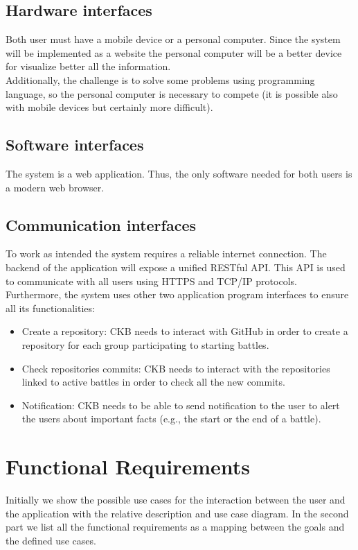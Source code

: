 \documentclass[12pt, a4paper]{report}
\newcounter{Requirements}
\newcounter{goals}
\begin{document}
    \subsection{Hardware interfaces}
    Both user must have a mobile device or a personal computer. 
    Since the system will be implemented as a website the personal computer will be a better device for visualize better all the information. \\
    Additionally, the challenge is to solve some problems using programming language, so the personal computer is necessary to compete (it is possible also with mobile devices but certainly more difficult). 

    \subsection{Software interfaces}
    The system is a web application. 
    Thus, the only software needed for both users is a modern web browser. 

    \subsection{Communication interfaces}
    To work as intended the system requires a reliable internet connection. 
    The backend of the application will expose a unified RESTful API. 
    This API is used to communicate with all users using HTTPS and TCP/IP protocols. \\
    Furthermore, the system uses other two application program interfaces to ensure all its functionalities: 
    \begin{itemize}
        \item Create a repository: CKB needs to interact with GitHub in order to create a repository for each group participating to starting battles. 
        \item Check repositories commits: CKB needs to interact with the repositories linked to active battles in order to check all the new commits. 
        \item Notification: CKB needs to be able to send notification to the user to alert the users about important facts (e.g., the start or the end of a battle). 
    \end{itemize}

    \section{Functional Requirements}
    Initially we show the possible use cases for the interaction between the user and the application with the relative description and use case diagram. 
    In the second part we list all the functional requirements as a mapping between the goals and the defined use cases. 
\end{document}
